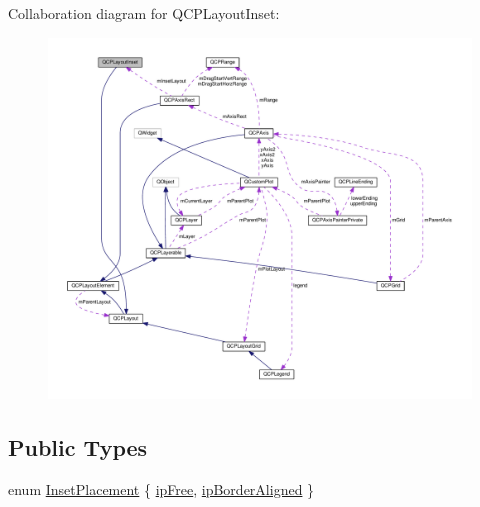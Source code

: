 Collaboration diagram for Q\+C\+P\+Layout\+Inset\+:\nopagebreak
\begin{figure}[H]
\begin{center}
\leavevmode
\includegraphics[width=350pt]{classQCPLayoutInset__coll__graph}
\end{center}
\end{figure}
\subsection*{Public Types}
\begin{DoxyCompactItemize}
\item 
enum \hyperlink{classQCPLayoutInset_a8b9e17d9a2768293d2a7d72f5e298192}{Inset\+Placement} \{ \hyperlink{classQCPLayoutInset_a8b9e17d9a2768293d2a7d72f5e298192aa4802986ea2cea457f932b115acba59e}{ip\+Free}, 
\hyperlink{classQCPLayoutInset_a8b9e17d9a2768293d2a7d72f5e298192aa81e7df4a785ddee2229a8f47c46e817}{ip\+Border\+Aligned}
 \}
\end{DoxyCompactItemize}
